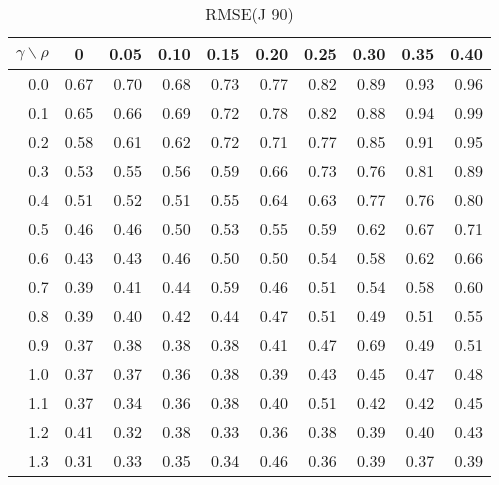 \documentclass[12pt]{article}
\begin{document}
%
\begin{table}[!tbp]
\caption{RMSE(J 90)}
 \begin{center}
 \begin{tabular}{r|rrrrrrrrr}\hline\hline
\multicolumn{1}{c|}{$\gamma\backslash\rho$}&\multicolumn{1}{c}{0}&\multicolumn{1}{c}{0.05}&\multicolumn{1}{c}{0.10}&\multicolumn{1}{c}{0.15}&\multicolumn{1}{c}{0.20}&\multicolumn{1}{c}{0.25}&\multicolumn{1}{c}{0.30}&\multicolumn{1}{c}{0.35}&\multicolumn{1}{c}{0.40}\tabularnewline
\hline

0.0&0.67&0.70&0.68&0.73&0.77&0.82&0.89&0.93&0.96\tabularnewline
0.1&0.65&0.66&0.69&0.72&0.78&0.82&0.88&0.94&0.99\tabularnewline
0.2&0.58&0.61&0.62&0.72&0.71&0.77&0.85&0.91&0.95\tabularnewline
0.3&0.53&0.55&0.56&0.59&0.66&0.73&0.76&0.81&0.89\tabularnewline
0.4&0.51&0.52&0.51&0.55&0.64&0.63&0.77&0.76&0.80\tabularnewline
0.5&0.46&0.46&0.50&0.53&0.55&0.59&0.62&0.67&0.71\tabularnewline
0.6&0.43&0.43&0.46&0.50&0.50&0.54&0.58&0.62&0.66\tabularnewline
0.7&0.39&0.41&0.44&0.59&0.46&0.51&0.54&0.58&0.60\tabularnewline
0.8&0.39&0.40&0.42&0.44&0.47&0.51&0.49&0.51&0.55\tabularnewline
0.9&0.37&0.38&0.38&0.38&0.41&0.47&0.69&0.49&0.51\tabularnewline
1.0&0.37&0.37&0.36&0.38&0.39&0.43&0.45&0.47&0.48\tabularnewline
1.1&0.37&0.34&0.36&0.38&0.40&0.51&0.42&0.42&0.45\tabularnewline
1.2&0.41&0.32&0.38&0.33&0.36&0.38&0.39&0.40&0.43\tabularnewline
1.3&0.31&0.33&0.35&0.34&0.46&0.36&0.39&0.37&0.39\tabularnewline
\hline
\end{tabular}

\end{center}

\end{table}
\end{document}
